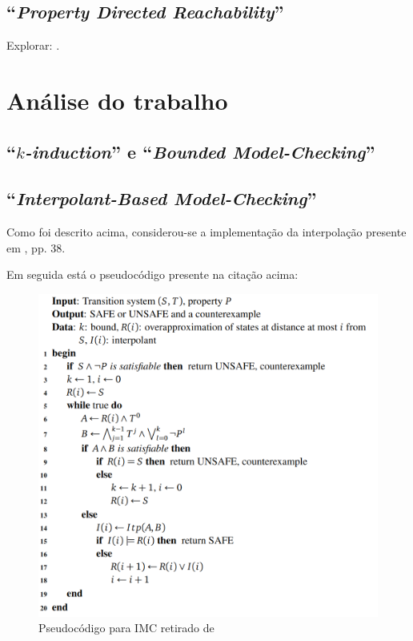 \documentclass[11pt,a4paper]{report}%
\def\pdr{``\textit{Property Directed Reachability}''\xspace}
\def\bmc{``\textit{Bounded Model-Checking}''\xspace}
\def\imc{``\textit{Interpolant-Based Model-Checking}''\xspace}
\def\kind{``\textit{$k$-induction}''\xspace}
\begin{document}
\section*{\pdr}

Explorar: \cite{pdrverification} \cite{pdr1} \cite{pdr2}.

\chapter{Análise do trabalho} \label{chap:analysis}

\newpage
\section{\kind e \bmc}

\newpage
\section{\imc}

Como foi descrito acima, considerou-se a implementação da interpolação presente em
\cite{interpolation2}, pp. 38.

Em seguida está o pseudocódigo presente na citação acima:

\begin{figure}[H]
      \centering
      \includegraphics[scale=0.66]{imc-pseudocode.png}
      \caption{Pseudocódigo para IMC retirado de \cite{interpolation2}}
      \label{fig:imcpseudo}
\end{figure}
\end{document}
